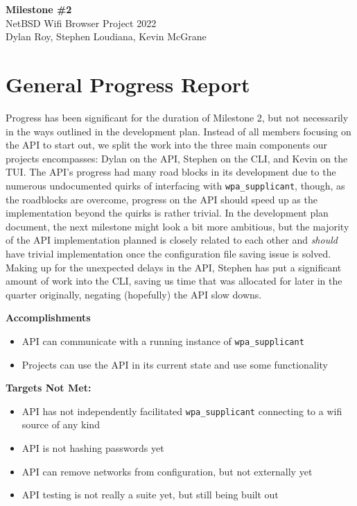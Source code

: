 \documentclass[11pt]{article}
\begin{document}
\begin{center}
  \textbf{\Large Milestone \#2}\\\large NetBSD Wifi Browser Project 2022\\
  Dylan Roy, Stephen Loudiana, Kevin McGrane
\end{center}


\section{General Progress Report}
Progress has been significant for the duration of Milestone 2, but not necessarily in the ways outlined
in the development plan. Instead of all members focusing on the API to start out, we split the work into
the three main components our projects encompasses: Dylan on the API, Stephen on the CLI, and Kevin on the TUI.
The API's progress had many road blocks in its development due to the numerous undocumented quirks of interfacing
with \texttt{wpa\_supplicant}, though, as the roadblocks are overcome, progress on the API should speed up
as the implementation beyond the quirks is rather trivial. In the development plan document, the next milestone
might look a bit more ambitious, but the majority of the API implementation planned is closely related to each
other and \textit{should} have trivial implementation once the configuration file saving issue is solved.
Making up for the unexpected delays in the API, Stephen has put a significant amount of work into the CLI, saving 
us time that was allocated for later in the quarter originally, negating (hopefully) the API slow downs.

\textbf{Accomplishments}
\begin{itemize}
  \item API can communicate with a running instance of \texttt{wpa\_supplicant}
  \item Projects can use the API in its current state and use some functionality
\end{itemize}

\textbf{Targets Not Met:}
\begin{itemize}
  \item API has not independently facilitated \texttt{wpa\_supplicant} connecting to a wifi source of any kind
  \item API is not hashing passwords yet
  \item API can remove networks from configuration, but not externally yet
  \item API testing is not really a suite yet, but still being built out
\end{itemize}
\end{document}
